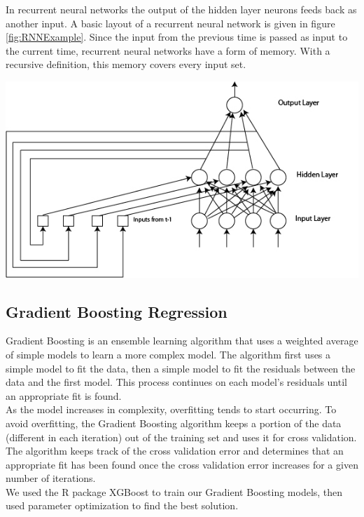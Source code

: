 \documentclass[twoside]{article}
\newenvironment{Figure}
{\par\medskip\noindent\minipage{\linewidth}}
{\endminipage\par\medskip}
\begin{document}
\begin{multicols}{2}
In recurrent neural networks the output of the hidden layer neurons feeds back as another input. A basic layout of a recurrent neural network is given in figure \ref{fig:RNNExample}. Since the input from the previous time is passed as input to the current time, recurrent neural networks have a form of memory. With a recursive definition, this memory covers every input set.


 \begin{Figure}
	 \centering
	 \includegraphics[width=\linewidth]{images/RNN.jpg}
	 \label{fig:RNNExample}
 \end{Figure}


\subsection{Gradient Boosting Regression}

\indent \indent Gradient Boosting is an ensemble learning algorithm that uses a weighted average of simple models to learn a more complex model. The algorithm first uses a simple model to fit the data, then a simple model to fit the residuals between the data and the first model. This process continues on each model's residuals until an appropriate fit is found. \\
As the model increases in complexity, overfitting tends to start occurring. To avoid overfitting, the Gradient Boosting algorithm keeps a portion of the data (different in each iteration) out of the training set and uses it for cross validation. The algorithm keeps track of the cross validation error and determines that an appropriate fit has been found once the cross validation error increases for a given number of iterations. \\
\indent We used the R package XGBoost to train our Gradient Boosting models, then used parameter optimization to find the best solution.



\end{multicols}
\end{document}

